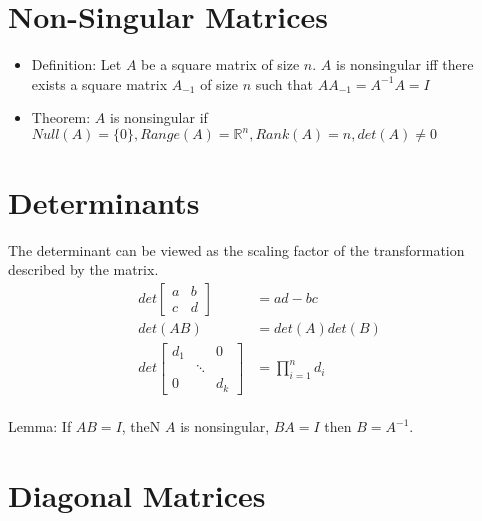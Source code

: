 \documentclass[12pt]{article}
\begin{document}
\section{Non-Singular Matrices}
\begin{itemize}
	\item Definition: Let $A$ be a square matrix of size $n$. $A$ is nonsingular iff there exists a square matrix $A_{-1}$ of size $n$ such that $AA_{-1}=A^{-1}A=I$
	\item Theorem: $A$ is nonsingular if $Null(A)=\{0\}, Range(A)=\mathbb{R}^n, Rank(A)=n, det(A)\ne 0$
\end{itemize}

\section{Determinants}
The determinant can be viewed as the scaling factor of the transformation described by the matrix.
\begin{align*}
	det\begin{bmatrix}
		a & b \\
		c & d 
	\end{bmatrix}&=ad-bc \\
	det(AB) &= det(A)det(B) \\ 
	det\begin{bmatrix}
		d_1 &  & 0 \\
		 & \ddots & \\
		0 & & d_k
	\end{bmatrix} &= \prod_{i=1}^{n}d_i
\end{align*}\\
Lemma: If $AB=I$, theN $A$ is nonsingular, $BA=I$ then $B=A^{-1}$.

\section{Diagonal Matrices}
\end{document}
